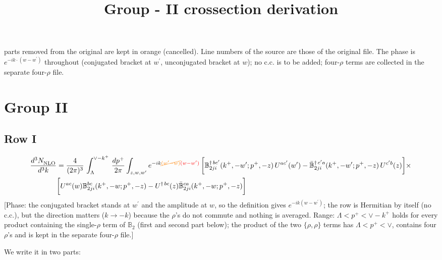 \documentclass[9pt]{article}
\title{Group - II crossection derivation}
\author{}
\date{}
\def\mf#1{\mathbb{#1}}
\numberwithin{equation}{section}
\begin{document}
\maketitle {} {\color{orange}parts removed from the original are kept in orange (cancelled).} {\color{red}Line numbers of the source are those of the original file. The phase is $e^{-ik\cdot(w-w^{\prime})}$ throughout (conjugated bracket at $w^{\prime}$, unconjugated bracket at $w$); no c.c. is to be added; four-$\rho$ terms are collected in the separate four-$\rho$ file.}\par
\section{Group II}
\subsection{Row I\,}
\begin{align}
    \frac{d^{3}N_{\rm NLO}^{\rm}}{d^{3}k}  & = \frac{4}{(2\pi)^{3}}\,\int_{\Lambda}^{\vee-k^{+}}\, \frac{dp^{+}}{2\pi}\int_{z,w,w^{\prime}} e^{-ik{\color{orange}\cancel{(w^{\prime}-w)}}{\color{red}(w-w^{\prime})}}\, \bigg[\mf{B}^{\dagger\, bc^{\prime}}_{2ji}(k^{+},-w^{\prime};p^{+},-z)\,U^{ac^{\prime}}(w^{\prime}) -\Bar{\mf{B}}^{\dagger\, c^{\prime}a}_{2ji}(k^{+},-w^{\prime}; p^{+},-z)\,U^{c^{\prime}b}(z)\bigg]\times\notag \\ & \bigg[U^{ac}(w) \mf{B}^{bc}_{2ji}(k^{+},-w;p^{+},-z) -U^{\dagger\, bc}(z)\Bar{\mf{B}}^{ca}_{2ji}(k^{+},-w; p^{+},-z)\bigg]\nonumber
\end{align} {\color{red}[Phase: the conjugated bracket stands at $w^\prime$ and the amplitude at $w$, so the definition gives $e^{-ik(w-w^\prime)}$; the row is Hermitian by itself (no c.c.), but the direction matters ($k\to-k$) because the $\rho$'s do not commute and nothing is averaged. Range: $\Lambda<p^+<\vee-k^+$ holds for every product containing the single-$\rho$ term of $\mf{B}_2$ (first and second part below); the product of the two $\{\rho,\rho\}$ terms has $\Lambda<p^+<\vee$, contains four $\rho$'s and is kept in the separate four-$\rho$ file.]}\par\noindent 
We write it in two parts: 
\end{document}
